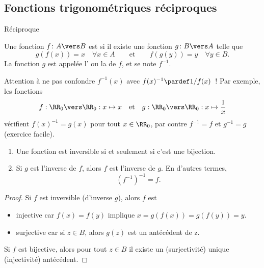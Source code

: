 \subsection{Fonctions trigonométriques réciproques}
\begin{frame}{Réciproque}
  \begin{definition}
    Une fonction $f\colon A \vers B$ est  si il existe une fonction $g\colon B \vers A$ telle que
    \begin{equation*}
      g(f(x)) = x\quad \forall x \in A \qquad\text{et}\qquad f(g(y)) = y \quad\forall y  \in B.
    \end{equation*}
    La fonction $g$ est appelée l' ou la  de $f$, et se note $f^{-1}$.
  \end{definition}\pause

\begin{remark*}
  Attention à ne pas confondre $f^{-1} (x)$ avec $f(x)^{-1} \pardef 1/f(x)$~! Par exemple, les fonctions
  \begin{equation*}
    f : \RR_0 \vers \RR_0 : x\mapsto x \quad\text{et}\quad g : \RR_0 \vers
    \RR_0 : x \mapsto \frac1x
  \end{equation*}
  vérifient $f(x)^{-1} = g(x)$ pour tout $x \in \RR_0$, par contre
  $f^{-1} = f$ et $g^{-1} = g$ (exercice facile).
\end{remark*}
\end{frame}
\begin{frame}
\begin{proposition}
  \begin{enumerate}
  \item Une fonction est inversible si et seulement si c'est une bijection.
  \item Si $g$ est l'inverse de $f$, alors $f$ est l'inverse de $g$. En d'autres termes,
    \begin{equation*}
      {\left(f^{-1}\right)}^{-1} = f.
    \end{equation*}
  \end{enumerate}
\end{proposition}
\begin{proof}
  Si \(f\) est inversible (d'inverse \(g\))\pause, alors \(f\) est
  \begin{itemize}[<+->]
  \item injective car \(f(x) = f(y)\) implique \(x = g(f(x)) = g(f(y)) = y\).
  \item surjective car si \(z \in B\), alors \(g(z)\) est un antécédent de z.
  \end{itemize}\pause
  Si \(f\) est bijective, alors pour tout \(z\in B\) il existe un (surjectivité) unique (injectivité) antécédent.
\end{proof}
\end{frame}
